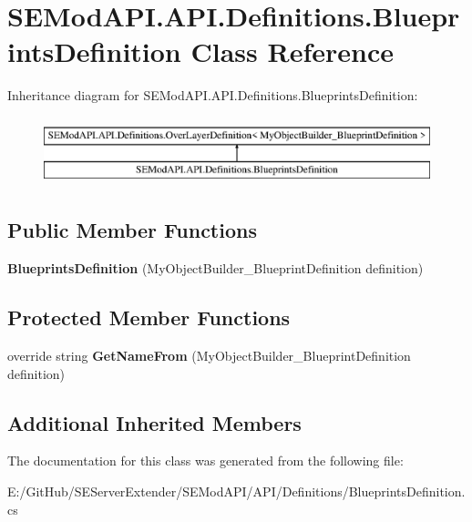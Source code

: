 \hypertarget{class_s_e_mod_a_p_i_1_1_a_p_i_1_1_definitions_1_1_blueprints_definition}{}\section{S\+E\+Mod\+A\+P\+I.\+A\+P\+I.\+Definitions.\+Blueprints\+Definition Class Reference}
\label{class_s_e_mod_a_p_i_1_1_a_p_i_1_1_definitions_1_1_blueprints_definition}
Inheritance diagram for S\+E\+Mod\+A\+P\+I.\+A\+P\+I.\+Definitions.\+Blueprints\+Definition\+:\begin{figure}[H]
\begin{center}
\leavevmode
\includegraphics[height=2.000000cm]{class_s_e_mod_a_p_i_1_1_a_p_i_1_1_definitions_1_1_blueprints_definition}
\end{center}
\end{figure}
\subsection*{Public Member Functions}
\begin{DoxyCompactItemize}
\item 
\hypertarget{class_s_e_mod_a_p_i_1_1_a_p_i_1_1_definitions_1_1_blueprints_definition_a4d14a46c703f4a37f9704cfae90a54be}{}{\bfseries Blueprints\+Definition} (My\+Object\+Builder\+\_\+\+Blueprint\+Definition definition)\label{class_s_e_mod_a_p_i_1_1_a_p_i_1_1_definitions_1_1_blueprints_definition_a4d14a46c703f4a37f9704cfae90a54be}

\end{DoxyCompactItemize}
\subsection*{Protected Member Functions}
\begin{DoxyCompactItemize}
\item 
\hypertarget{class_s_e_mod_a_p_i_1_1_a_p_i_1_1_definitions_1_1_blueprints_definition_a952e5091438e366404782b8b7de64cb6}{}override string {\bfseries Get\+Name\+From} (My\+Object\+Builder\+\_\+\+Blueprint\+Definition definition)\label{class_s_e_mod_a_p_i_1_1_a_p_i_1_1_definitions_1_1_blueprints_definition_a952e5091438e366404782b8b7de64cb6}

\end{DoxyCompactItemize}
\subsection*{Additional Inherited Members}


The documentation for this class was generated from the following file\+:\begin{DoxyCompactItemize}
\item 
E\+:/\+Git\+Hub/\+S\+E\+Server\+Extender/\+S\+E\+Mod\+A\+P\+I/\+A\+P\+I/\+Definitions/Blueprints\+Definition.\+cs\end{DoxyCompactItemize}
